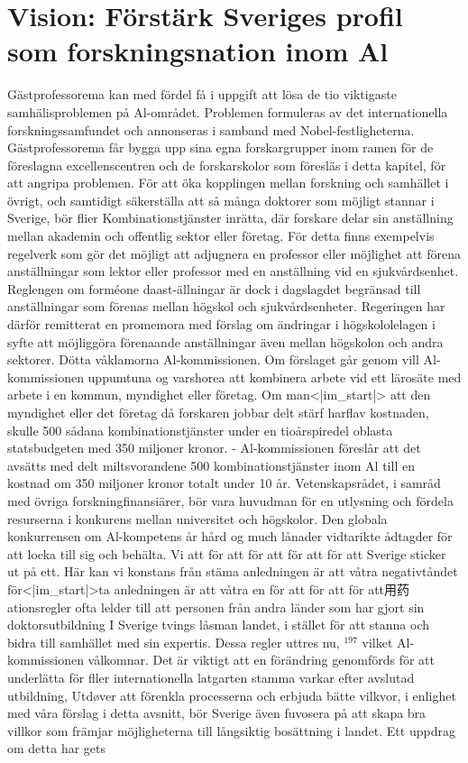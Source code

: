 {{{{{{{{\section*{Vision: Förstärk Sveriges profil som forskningsnation inom Al}
Gästprofessorema kan med fördel få i uppgift att lösa de tio viktigaste samhälisproblemen på Al-området. Problemen formuleras av det internationella forskningssamfundet och annonseras i samband med Nobel-festligheterna. Gästprofessorema får bygga upp sina egna forskargrupper inom ramen för de föreslagna excellenscentren och de forskarskolor som föresläs i detta kapitel, för att angripa problemen.
För att öka kopplingen mellan forskning och samhället i övrigt, och samtidigt säkerställa att så många doktorer som möjligt stannar i Sverige, bör flier Kombinationstjänster inrätta, där forskare delar sin anställning mellan akademin och offentlig sektor eller företag. För detta finns exempelvis regelverk som gör det möjligt att adjugnera en professor eller möjlighet att förena anställningar som lektor eller professor med en anställning vid en sjukvårdsenhet. Reglengen om forméone daast-ällningar är dock i dagslagdet begränsad till anställningar som förenas mellan högskol och sjukvårdsenheter. Regeringen har därför remitterat en promemora med förslag om ändringar i högskololelagen i syfte att möjliggöra förenaande anställningar även mellan högskolon och andra sektorer. Dötta våklamorna Al-kommissionen.
Om förslaget går genom vill Al-kommissionen uppumtuna og varshorea att kombinera arbete vid ett lärosäte med arbete i en kommun, myndighet eller företag. Om man<|im_start|> att den myndighet eller det företag då forskaren jobbar delt stärf harflav kostnaden, skulle 500 sådana kombinationstjänster under en tioårspiredel oblasta statsbudgeten med 350 miljoner kronor.
- Al-kommissionen föreslår att det avsätts med delt miltsvorandene 500 kombinationstjänster inom Al till en kostnad om 350 miljoner kronor totalt under 10 år. Vetenskapsrådet, i samråd med övriga forskningfinansiärer, bör vara huvudman för en utlysning och fördela resurserna i konkurens mellan universitet och högskolor.
Den globala konkurrensen om Al-kompetens år hård og much lånader vidtarikte ådtagder för att locka till sig och behälta. Vi att för att för att för att för att Sverige sticker ut på ett. Här kan vi konstans från stäma anledningen är att våtra negativtåndet för<|im_start|>ta anledningen är att våtra en för att för att för att用药ationsregler ofta lelder till att personen från andra länder som har gjort sin doktorsutbildning I Sverige tvings låsman landet, i stället för att stanna och bidra till samhället med sin expertis. Dessa regler uttres nu, \({ }^{197}\) vilket Al-kommissionen vålkomnar. Det är viktigt att en förändring genomförds för att underlätta för fller internationella latgarten stamma varkar efter avslutad utbildning, Utdøver att förenkla processerna och erbjuda bätte vilkvor, i enlighet med våra förslag i detta avsnitt, bör Sverige även fuvosera på att skapa bra villkor som främjar möjligheterna till långsiktig bosättning i landet. Ett uppdrag om detta har gets

}}}}}}}}
